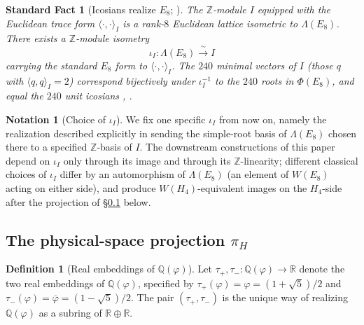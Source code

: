 \documentclass[11pt, a4paper]{amsart}
\newtheorem{fact}[theorem]{Standard Fact}
\theoremstyle{definition}
\newtheorem{definition}[theorem]{Definition}
\newtheorem{notation}[theorem]{Notation}
\newcommand{\R}{\mathbb{R}}
\newcommand{\Q}{\mathbb{Q}}
\newcommand{\Z}{\mathbb{Z}}
\begin{document}
\begin{fact}[Icosians realize $E_8$; \cite{ConwaySloane, MoodyPatera}]
\label{fact:icosian-E8}
The $\Z$-module $I$ equipped with the Euclidean trace form
$\langle \cdot, \cdot \rangle_I$ is a rank-$8$ Euclidean lattice
isometric to $\Lambda(E_8)$. There exists a $\Z$-module isometry
\[
  \iota_I \colon \Lambda(E_8) \xrightarrow{\;\sim\;} I
\]
carrying the standard $E_8$ form to $\langle \cdot, \cdot \rangle_I$.
The $240$ minimal vectors of $I$ (those $q$ with
$\langle q, q \rangle_I = 2$) correspond bijectively under $\iota_I^{-1}$
to the $240$ roots in $\Phi(E_8)$, and equal the $240$ unit
icosians \cite[Ch.~8, Eq.~(17) and Table~8.1]{ConwaySloane},
\cite[\S 4.1]{MoodyPatera}.
\end{fact}

\begin{notation}[Choice of $\iota_I$]
\label{not:choice-iotaI}
We fix one specific $\iota_I$ from now on, namely the realization
described explicitly in \cite[Ch.~8, Table~8.1]{ConwaySloane}
sending the simple-root basis of $\Lambda(E_8)$ chosen there to a
specified $\Z$-basis of $I$. The downstream constructions of this
paper depend on $\iota_I$ only through its image and through its
$\Z$-linearity; different classical choices of $\iota_I$ differ by
an automorphism of $\Lambda(E_8)$ (an element of $W(E_8)$ acting on
either side), and produce $W(H_4)$-equivalent images on the
$H_4$-side after the projection of \S\ref{subsec:pi-H} below.
\end{notation}

\subsection{The physical-space projection $\pi_H$}
\label{subsec:pi-H}

\begin{definition}[Real embeddings of $\Q(\varphi)$]
\label{def:real-embeddings}
Let $\tau_+, \tau_- \colon \Q(\varphi) \to \R$ denote the two
real embeddings of $\Q(\varphi)$, specified by $\tau_+(\varphi) =
\varphi = (1+\sqrt 5)/2$ and $\tau_-(\varphi) = \bar\varphi =
(1-\sqrt 5)/2$. The pair $(\tau_+, \tau_-)$ is the unique way of
realizing $\Q(\varphi)$ as a subring of $\R \oplus \R$.
\end{definition}
\end{document}
